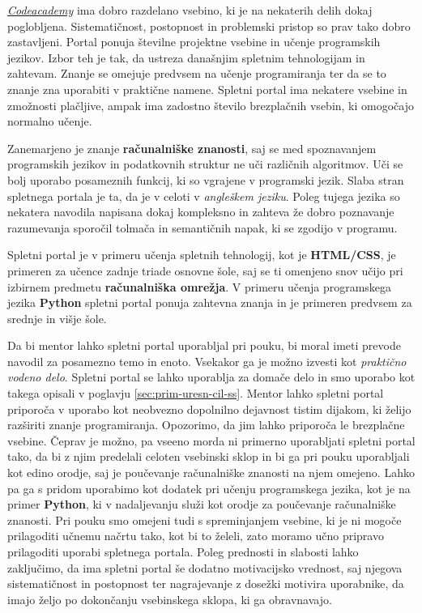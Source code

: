 \emph{\href{https://www.codecademy.com/}{Codeacademy}}
\cite{web:codeacademy} ima dobro razdelano vsebino, ki je na nekaterih
delih dokaj poglobljena. Sistematičnost, postopnost in problemski
pristop so prav tako dobro zastavljeni. Portal ponuja številne
projektne vsebine in učenje programskih jezikov. Izbor teh je tak, da
ustreza današnjim spletnim tehnologijam in zahtevam. Znanje se omejuje
predvsem na učenje programiranja ter da se to znanje zna uporabiti v
praktične namene. Spletni portal ima nekatere vsebine in zmožnosti
plačljive, ampak ima zadostno število brezplačnih vsebin, ki omogočajo
normalno učenje. 

Zanemarjeno je znanje \textbf{računalniške znanosti}, saj se med
spoznavanjem programskih jezikov in podatkovnih struktur ne uči
različnih algoritmov. Uči se bolj uporabo posameznih funkcij, ki so
vgrajene v programski jezik. Slaba stran spletnega portala je ta, da
je v celoti v \emph{angleškem jeziku}. Poleg tujega jezika so nekatera
navodila napisana dokaj kompleksno in zahteva že dobro poznavanje
razumevanja sporočil tolmača in semantičnih napak, ki se zgodijo v
programu.

Spletni portal je v primeru učenja spletnih tehnologij, kot je
\textbf{HTML/CSS}, je primeren za učence zadnje triade osnovne šole,
saj se ti omenjeno snov učijo pri izbirnem predmetu
\textbf{računalniška omrežja}. V primeru učenja programskega jezika
\textbf{Python} spletni portal ponuja zahtevna znanja in je primeren
predvsem za srednje in višje šole.

Da bi mentor lahko spletni portal uporabljal pri pouku, bi moral imeti
prevode navodil za posamezno temo in enoto. Vsekakor ga je možno izvesti
kot \emph{praktično vodeno delo}. Spletni portal se lahko uporablja za
domače delo in smo uporabo kot takega opisali v poglavju
\ref{sec:prim-uresn-cil-ss}. Mentor lahko spletni portal priporoča v
uporabo kot neobvezno dopolnilno dejavnost tistim dijakom, ki
želijo razširiti znanje programiranja. Opozorimo, da jim lahko
priporoča le brezplačne vsebine. Čeprav je možno, pa vseeno morda ni
primerno uporabljati spletni portal tako, da bi z njim predelali
celoten vsebinski sklop in bi ga pri pouku uporabljali kot edino
orodje, saj je poučevanje računalniške znanosti na njem omejeno. Lahko pa
ga s pridom uporabimo kot dodatek pri učenju programskega jezika,
kot je na primer \textbf{Python}, ki v nadaljevanju služi kot orodje
za poučevanje računalniške znanosti. Pri pouku smo omejeni tudi s
spreminjanjem vsebine, ki je ni mogoče prilagoditi učnemu načrtu
tako, kot bi to želeli, zato moramo učno pripravo prilagoditi uporabi
spletnega portala. Poleg prednosti in slabosti lahko zaključimo, da
ima spletni portal še dodatno motivacijsko vrednost, saj njegova
sistematičnost in postopnost ter nagrajevanje z dosežki motivira
uporabnike, da imajo željo po dokončanju vsebinskega sklopa, ki ga
obravnavajo. 

